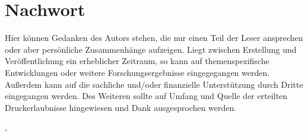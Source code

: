 \section*{Nachwort}\label{sec:nachwort}


Hier können Gedanken des Autors stehen, die nur einen Teil der Leser ansprechen oder aber persönliche Zusammenhänge aufzeigen.
Liegt zwischen Erstellung und Veröffentlichung ein erheblicher Zeitraum, so kann auf themenspezifische Entwicklungen oder weitere Forschungsergebnisse eingegegangen werden.
Außerdem kann auf die sachliche und/oder finanzielle Unterstützung durch Dritte eingegangen werden.
Des Weiteren sollte auf Umfang und Quelle der erteilten Druckerlaubnisse hingewiesen und Dank ausgesprochen werden.


\vspace{0.5cm}

\begingroup
\raggedright{\epiloguelocation, \epiloguedate}
\hfill
\raggedleft{\textit{\thesisauthor}}
\raggedright
\endgroup